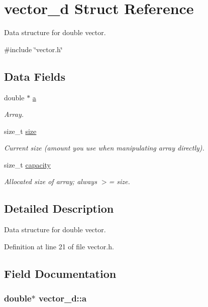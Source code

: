 \hypertarget{structvector__d}{\section{vector\-\_\-d \-Struct \-Reference}
\label{structvector__d}
}


\-Data structure for double vector.  




{\ttfamily \#include \char`\"{}vector.\-h\char`\"{}}

\subsection*{\-Data \-Fields}
\begin{DoxyCompactItemize}
\item 
double $\ast$ \hyperlink{structvector__d_a925832a4ece20022fbe241e7e38ec329}{a}
\begin{DoxyCompactList}\small\item\em \-Array. \end{DoxyCompactList}\item 
size\-\_\-t \hyperlink{structvector__d_a1a8bccf26d9cef41fd453f6feb2f15b1}{size}
\begin{DoxyCompactList}\small\item\em \-Current size (amount you use when manipulating array directly). \end{DoxyCompactList}\item 
size\-\_\-t \hyperlink{structvector__d_a83fb5c9689de179f0dfe1413d720cdc3}{capacity}
\begin{DoxyCompactList}\small\item\em \-Allocated size of array; always $>$= size. \end{DoxyCompactList}\end{DoxyCompactItemize}


\subsection{\-Detailed \-Description}
\-Data structure for double vector. 



\-Definition at line 21 of file vector.\-h.



\subsection{\-Field \-Documentation}
\hypertarget{structvector__d_a925832a4ece20022fbe241e7e38ec329}{
\subsubsection[{a}]{\setlength{\rightskip}{0pt plus 5cm}double$\ast$ {\bf vector\-\_\-d\-::a}}}\label{structvector__d_a925832a4ece20022fbe241e7e38ec329}


